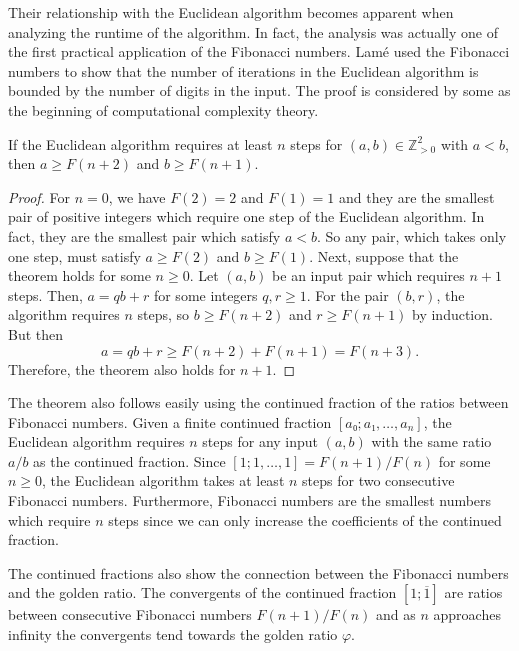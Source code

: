 Their relationship with the Euclidean algorithm becomes apparent when analyzing
the runtime of the algorithm.
In fact, the analysis was actually one of the first practical application of
the Fibonacci numbers.
Lamé \cite{Lame44} used the Fibonacci numbers to show that the number of
iterations in the Euclidean algorithm is bounded by the number of digits in the
input.
The proof is considered by some as the beginning of computational
complexity theory.

\begin{theorem}
  \label{thm:lame}
  If the Euclidean algorithm requires at least $n$ steps for $(a, b) ∈ ℤ_{> 0}^2$ with $a < b$,
  then $a ≥ F(n+2)$ and $b ≥ F(n+1)$.
\end{theorem}

\begin{proof}
  For $n = 0$, we have $F(2) = 2$ and $F(1) = 1$
  and they are the smallest pair of positive integers which require one step of
  the Euclidean algorithm.
  In fact, they are the smallest pair which satisfy $a < b$.
  So any pair, which takes only one step, must satisfy $a ≥ F(2)$ and $b ≥ F(1)$.
  Next, suppose that the theorem holds for some $n ≥ 0$.
  Let $(a, b)$ be an input pair which requires $n+1$ steps.
  Then, $a = qb + r$ for some integers $q, r ≥ 1$.
  For the pair $(b, r)$, the algorithm requires $n$ steps, so $b ≥ F(n+2)$ and
  $r ≥ F(n+1)$ by induction.
  But then
  \[
    a = qb + r ≥ F(n+2) + F(n+1) = F(n+3).
  \]
  Therefore, the theorem also holds for $n+1$.
\end{proof}

The theorem also follows easily using the continued fraction of the ratios
between Fibonacci numbers.
Given a finite continued fraction $[a₀; a₁, …, a_n]$, the Euclidean algorithm
requires $n$ steps for any input $(a, b)$ with the same ratio $a/b$ as the
continued fraction.
Since $[1; 1, …, 1] = F(n+1)/F(n)$ for some $n ≥ 0$, the Euclidean algorithm
takes at least $n$ steps for two consecutive Fibonacci numbers.
Furthermore, Fibonacci numbers are the smallest numbers which require $n$ steps
since we can only increase the coefficients of the continued fraction.

The continued fractions also show the connection between the Fibonacci numbers
and the golden ratio.
The convergents of the continued fraction $[1; \overline{1}]$ are ratios
between consecutive Fibonacci numbers $F(n+1)/F(n)$ and as $n$ approaches
infinity the convergents tend towards the golden ratio $φ$.

\iffalse
\begin{example}
  Consider $a = 13$ and $b = 8$.
  The algorithm proceeds as follows:
  \[
    \begin{array}{rclcrcl}
      13/8 & = & 1 & · & 5/8 & + & 3/8 \\
       5/8 & = & 1 & · & 3/8 & + & 2/8 \\
       3/8 & = & 1 & · & 2/8 & + & 1/8 \\
       2/8 & = & 2 & · & 1/8 & + & 0.
    \end{array}
  \]
\end{example}
\fi

